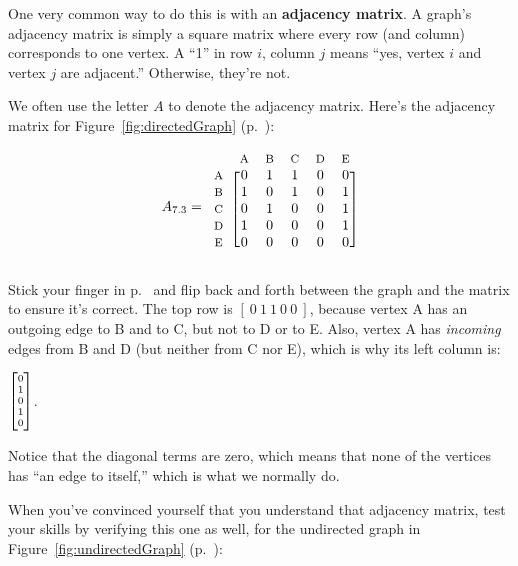 \begin{alttitles}
One very common way to do this is with an \textbf{adjacency matrix}. A graph's
adjacency matrix is simply a square matrix where every row (and column)
corresponds to one vertex. A ``1'' in row $i$, column $j$ means ``yes, vertex
$i$ and vertex $j$ are adjacent.'' Otherwise, they're not.

We often use the letter $A$ to denote the adjacency matrix. Here's the
adjacency matrix for Figure~\ref{fig:directedGraph}
(p.~\pageref{fig:directedGraph}):

\label{firstAdjacencyMatrix}
\[
A_{7.3} = 
\begin{blockarray}{cccccc}
& {\footnotesize\textrm{A}} & {\footnotesize\textrm{B}} & {\footnotesize\textrm{C}} & {\footnotesize\textrm{D}} & {\footnotesize\textrm{E}} \\
\begin{block}{c[ccccc]}
{\footnotesize\textrm{A}} & 0 & 1 & 1 & 0 & 0 \\
{\footnotesize\textrm{B}} & 1 & 0 & 1 & 0 & 1 \\
{\footnotesize\textrm{C}} & 0 & 1 & 0 & 0 & 1 \\
{\footnotesize\textrm{D}} & 1 & 0 & 0 & 0 & 1 \\
{\footnotesize\textrm{E}} & 0 & 0 & 0 & 0 & 0 \\
\end{block}
\end{blockarray}
\]

Stick your finger in p.~\pageref{fig:directedGraph} and flip back and forth
between the graph and the matrix to ensure it's correct. The top row is $[\ 0\
1\ 1\ 0\ 0\ ]$, because vertex A has an outgoing edge to B and to C, but not to
D or to E. Also, vertex A has \textit{incoming} edges from B and D (but neither
from C nor E), which is why its left column is:

\vspace{-.15in}
\begin{center}
${\scriptsize \begin{bmatrix} 0
\\ 1 \\ 0 \\ 1 \\ 0 \end{bmatrix}}$.
\end{center}

Notice that the diagonal terms are zero, which means that none of the vertices
has ``an edge to itself,'' which is what we normally do.

When you've convinced yourself that you understand that adjacency matrix, test
your skills by verifying this one as well, for the undirected graph in 
Figure~\ref{fig:undirectedGraph} (p.~\pageref{fig:undirectedGraph}):


\end{alttitles}
